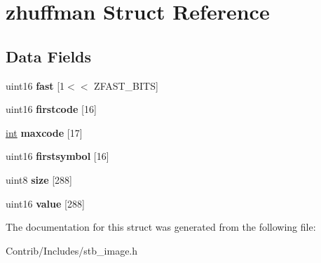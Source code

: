 \hypertarget{structzhuffman}{}\section{zhuffman Struct Reference}
\label{structzhuffman}
\subsection*{Data Fields}
\begin{DoxyCompactItemize}
\item 
uint16 {\bfseries fast} \mbox{[}1$<$$<$ Z\+F\+A\+S\+T\+\_\+\+B\+I\+TS\mbox{]}\hypertarget{structzhuffman_a11fb629dfc604ec0a3d0df5232c4cd9f}{}\label{structzhuffman_a11fb629dfc604ec0a3d0df5232c4cd9f}

\item 
uint16 {\bfseries firstcode} \mbox{[}16\mbox{]}\hypertarget{structzhuffman_a1d66c12f6df08d0217e082696fc1dfe1}{}\label{structzhuffman_a1d66c12f6df08d0217e082696fc1dfe1}

\item 
\hyperlink{_s_d_l__thread_8h_a6a64f9be4433e4de6e2f2f548cf3c08e}{int} {\bfseries maxcode} \mbox{[}17\mbox{]}\hypertarget{structzhuffman_adb11ab11e01b6cfce57aa64908330d26}{}\label{structzhuffman_adb11ab11e01b6cfce57aa64908330d26}

\item 
uint16 {\bfseries firstsymbol} \mbox{[}16\mbox{]}\hypertarget{structzhuffman_acf594a598ea4669bba70562b5e828eb9}{}\label{structzhuffman_acf594a598ea4669bba70562b5e828eb9}

\item 
uint8 {\bfseries size} \mbox{[}288\mbox{]}\hypertarget{structzhuffman_a3280c4301413b708863915d476c3c29c}{}\label{structzhuffman_a3280c4301413b708863915d476c3c29c}

\item 
uint16 {\bfseries value} \mbox{[}288\mbox{]}\hypertarget{structzhuffman_a6b49bcbac1bdc3b1041c47c693be79a2}{}\label{structzhuffman_a6b49bcbac1bdc3b1041c47c693be79a2}

\end{DoxyCompactItemize}


The documentation for this struct was generated from the following file\+:\begin{DoxyCompactItemize}
\item 
Contrib/\+Includes/stb\+\_\+image.\+h\end{DoxyCompactItemize}
